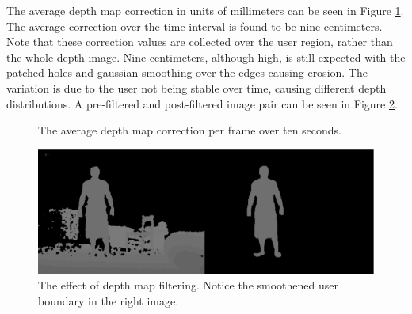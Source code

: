 \documentclass[number,preprint,review,12pt]{elsarticle}
\begin{document}
{\color{red}
The average depth map correction in units of millimeters can be seen in Figure \ref{fig:depth_graph}. The average correction over the time interval is found to be nine centimeters. Note that these correction values are collected over the user region, rather than the whole depth image. Nine centimeters, although high, is still expected with the patched holes and gaussian smoothing over the edges causing erosion. The variation is due to the user not being stable over time, causing different depth distributions. A pre-filtered and post-filtered image pair can be seen in Figure \ref{fig:depth_figure}. 

\begin{figure}[htbp]
{\color{red}
	\begin{center} 
	\end{center}
	\caption{The average depth map correction per frame over ten seconds. }
	\label{fig:depth_graph}
}
\end{figure}

\begin{figure}[htbp]
{\color{red}
	\begin{center} 
	\includegraphics[width=1.0\textwidth]{./depth_comparison.eps}
	\end{center}
	\caption{The effect of depth map filtering. Notice the smoothened user boundary in the right image. }
	\label{fig:depth_figure}
}
\end{figure}
}
\end{document}
